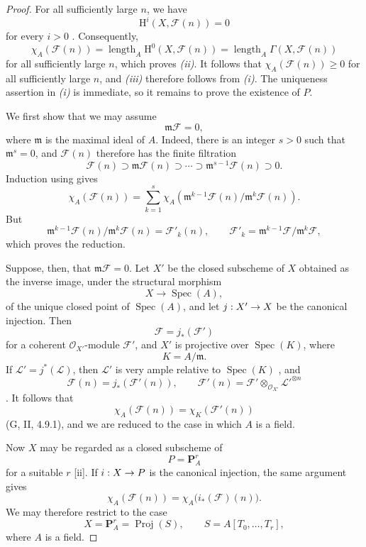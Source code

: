 \documentclass[oneside]{amsart}
\theoremstyle{ega-env-style}
\theoremstyle{ega-thm-env-style}
\theoremstyle{ega-defn-env-style}
\def\mathcal{\mathscr}
\def\sh{\mathcal}                   %
\def\geq{\geqslant}                 %
\def\HH{\mathrm{H}}                 %
\def\Proj{\operatorname{Proj}}
\def\Spec{\operatorname{Spec}}
\renewcommand{\to}{\mathchoice{\longrightarrow}{\rightarrow}{\rightarrow}{\rightarrow}}
\newcommand{\oldpage}[2][]{{\marginnote{\normalfont{\textbf{#1}~|~#2}}}\ignorespaces}
\begin{document}
\begin{proof}
For all sufficiently large $n$, we have
\[
  \HH^i(X,\sh{F}(n))=0
\]
for every $i>0$ .
\oldpage[III]{110}
Consequently,
\[
  \chi_A(\sh{F}(n))
  =
  \operatorname{length}_A\HH^0(X,\sh{F}(n))
  =
  \operatorname{length}_A\Gamma(X,\sh{F}(n))
\]
for all sufficiently large $n$, which proves \emph{(ii)}.
It follows that $\chi_A(\sh{F}(n))\geq0$ for all sufficiently large $n$, and \emph{(iii)} therefore follows from \emph{(i)}.
The uniqueness assertion in \emph{(i)} is immediate, so it remains to prove the existence of $P$.

We first show that we may assume
\[
  \mathfrak{m}\sh{F}=0,
\]
where $\mathfrak{m}$ is the maximal ideal of $A$.
Indeed, there is an integer $s>0$ such that $\mathfrak{m}^s=0$, and $\sh{F}(n)$ therefore has the finite filtration
\[
  \sh{F}(n)
  \supset\mathfrak{m}\sh{F}(n)
  \supset\cdots
  \supset\mathfrak{m}^{s-1}\sh{F}(n)
  \supset0.
\]
Induction using  gives
\[
  \chi_A(\sh{F}(n))
  =
  \sum_{k=1}^{s}
  \chi_A\left(
    \mathfrak{m}^{k-1}\sh{F}(n)/
    \mathfrak{m}^{k}\sh{F}(n)
  \right).
\]
But
\[
  \mathfrak{m}^{k-1}\sh{F}(n)/
  \mathfrak{m}^{k}\sh{F}(n)
  =
  \sh{F}'_k(n),
  \qquad
  \sh{F}'_k=
  \mathfrak{m}^{k-1}\sh{F}/\mathfrak{m}^{k}\sh{F},
\]
which proves the reduction.

Suppose, then, that $\mathfrak{m}\sh{F}=0$.
Let $X'$ be the closed subscheme of $X$ obtained as the inverse image, under the structural morphism
\[
  X\longrightarrow\Spec(A),
\]
of the unique closed point of $\Spec(A)$, and let $j:X'\to X$ be the canonical injection.
Then
\[
  \sh{F}=j_*(\sh{F}')
\]
for a coherent $\sh{O}_{X'}$-module $\sh{F}'$, and $X'$ is projective over $\Spec(K)$, where
\[
  K=A/\mathfrak{m}.
\]
If $\sh{L}'=j^*(\sh{L})$, then $\sh{L}'$ is very ample relative to $\Spec(K)$ , and
\[
  \sh{F}(n)=j_*(\sh{F}'(n)),
  \qquad
  \sh{F}'(n)
  =
  \sh{F}'\otimes_{\sh{O}_{X'}}\sh{L}'^{\otimes n}
\]
.
It follows that
\[
  \chi_A(\sh{F}(n))
  =
  \chi_K(\sh{F}'(n))
\]
(G, II, 4.9.1), and we are reduced to the case in which $A$ is a field.

Now $X$ may be regarded as a closed subscheme of
\[
  P=\mathbf{P}_A^r
\]
for a suitable $r$ [ii].
If $i:X\to P$ is the canonical injection, the same argument gives
\[
  \chi_A(\sh{F}(n))
  =
  \chi_A\bigl(i_*(\sh{F})(n)\bigr).
\]
We may therefore restrict to the case
\[
  X=\mathbf{P}_A^r=\Proj(S),
  \qquad
  S=A[T_0,\ldots,T_r],
\]
where $A$ is a field.


\end{proof}
\end{document}
